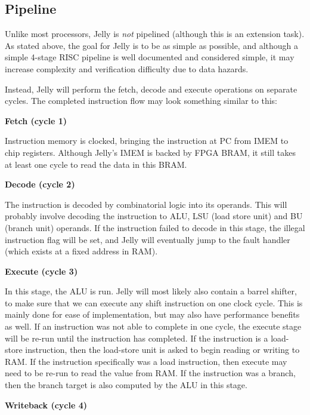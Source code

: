 \documentclass{article}
\begin{document}
\subsection{Pipeline}
Unlike most processors, Jelly is \textit{not} pipelined (although this is an extension task). As stated
above, the goal for Jelly is to be as simple as possible, and although a simple 4-stage RISC pipeline is well
documented and considered simple, it may increase complexity and verification difficulty due to data hazards.

Instead, Jelly will perform the fetch, decode and execute operations on separate cycles. The completed
instruction flow may look something similar to this:

\textbf{Fetch (cycle 1)}

Instruction memory is clocked, bringing the instruction at PC from IMEM to chip registers. Although
Jelly's IMEM is backed by FPGA BRAM, it still takes at least one cycle to read the data in this BRAM.

\textbf{Decode (cycle 2)}

The instruction is decoded by combinatorial logic into its operands. This will probably involve decoding the
instruction to ALU, LSU (load store unit) and BU (branch unit) operands. If the instruction failed to decode
in this stage, the illegal instruction flag will be set, and Jelly will eventually jump to the fault handler
(which exists at a fixed address in RAM). 

\textbf{Execute (cycle 3)}

In this stage, the ALU is run. Jelly will most likely also contain a barrel shifter, to make sure that we can
execute any shift instruction on one clock cycle. This is mainly done for ease of implementation, but may
also have performance benefits as well. If an instruction was not able to complete in one cycle, the execute
stage will be re-run until the instruction has completed. If the instruction is a load-store instruction,
then the load-store unit is asked to begin reading or writing to RAM. If the instruction specifically was a
load instruction, then execute may need to be re-run to read the value from RAM. If the instruction was a
branch, then the branch target is also computed by the ALU in this stage.


\textbf{Writeback (cycle 4)}
\end{document}

